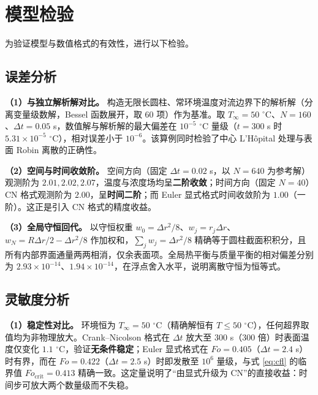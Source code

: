 \section{模型检验}
为验证模型与数值格式的有效性，进行以下检验。

\subsection{误差分析}
\textbf{（1）与独立解析解对比。} 构造无限长圆柱、常环境温度对流边界下的解析解（分离变量级数解，Bessel 函数展开，取 60 项）作为基准。取 $T_\infty=50$ $^\circ$C、$N=160$、$\Delta t=0.05$ s，数值解与解析解的最大偏差在 $10^{-5}$ $^\circ$C 量级（$t=300$ s 时 $5.31\times10^{-5}$ $^\circ$C），相对误差小于 $10^{-6}$。该算例同时检验了中心 L'H\^opital 处理与表面 Robin 离散的正确性。

\textbf{（2）空间与时间收敛阶。} 空间方向（固定 $\Delta t=0.02$ s，以 $N=640$ 为参考解）观测阶为 $2.01,2.02,2.07$，温度与浓度场均呈\textbf{二阶收敛}；时间方向（固定 $N=40$）CN 格式观测阶为 $2.00$，呈\textbf{时间二阶}；而 Euler 显式格式时间收敛阶为 $1.00$（一阶）。这正是引入 CN 格式的精度收益。

\textbf{（3）全局守恒回代。} 以守恒权重 $w_0=\Delta r^2/8$、$w_j=r_j\Delta r$、$w_N=R\Delta r/2-\Delta r^2/8$ 作加权和，$\sum_j w_j=\Delta r^2/8$ 精确等于圆柱截面积积分，且所有内部界面通量两两相消，仅余表面项。全局热平衡与质量平衡的相对偏差分别为 $2.93\times10^{-14}$、$1.94\times10^{-14}$，在浮点舍入水平，说明离散守恒为恒等式。

\subsection{灵敏度分析}
\textbf{（1）稳定性对比。} 环境恒为 $T_\infty=50$ $^\circ$C（精确解恒有 $T\le50$ $^\circ$C），任何超界取值均为非物理放大。Crank--Nicolson 格式在 $\Delta t$ 放大至 $300$ s（$300$ 倍）时表面温度仅变化 $1.1$ $^\circ$C，验证\textbf{无条件稳定}；Euler 显式格式在 $Fo=0.405$（$\Delta t=2.4$ s）时有界，而在 $Fo=0.422$（$\Delta t=2.5$ s）时即发散至 $10^6$ 量级，与式 \eqref{eq:cfl} 的临界值 $Fo_{\text{crit}}=0.413$ 精确一致。这定量说明了“由显式升级为 CN”的直接收益：时间步可放大两个数量级而不失稳。

